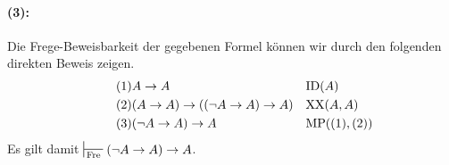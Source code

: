 \begin{multicols}{2}

      \paragraph{(3):}
      Die Frege-Beweisbarkeit der gegebenen Formel können wir durch den folgenden direkten Beweis zeigen.
      \begin{align}
        &\tag{1}
          A\to A
          && \mathrm{ID}(A)\\
        &\tag{2}
          (A\to A)\to((\lnot A\to A)\to A)
          && \mathrm{XX}(A,A) \\
        &\tag{3}
          (\lnot A\to A)\to A
          && \mathrm{MP}((1),(2))
      \end{align}
      Es gilt damit $\fregeProof (\lnot A\to A)\to A$. \qedbox


\end{multicols}
